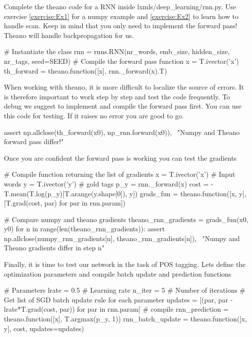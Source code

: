 \begin{exercise}
Complete the theano code for a RNN inside lxmls/deep\_learning/rnn.py. Use
exercise \ref{exercise:Ex1} for a numpy example and \ref{exercise:Ex2} to learn
how to handle scan. Keep in mind that you only need to implement the forward
pass! Theano will handle backpropagation for us. 
\begin{python}
# Instantiate the class
rnn = rnns.RNN(nr_words, emb_size, hidden_size, nr_tags, seed=SEED)
# Compile the forward pass function
x = T.ivector('x')
th_forward = theano.function([x], rnn._forward(x).T)
\end{python}
When working with theano, it is more difficult to localize the source of
errors. It is therefore important to work step by step and test the
code frequently. To debug we suggest to implement and compile the forward pass
first. You can use this code for testing. If it raises no error you are good to
go.
\begin{python}
assert np.allclose(th_forward(x0), np_rnn.forward(x0)), \
    "Numpy and Theano forward pass differ!"
\end{python}
Once you are confident the forward pass is working you can test the gradients
\begin{python}
# Compile function returning the list of gradients
x = T.ivector('x')     # Input words
y = T.ivector('y')     # gold tags 
p_y = rnn._forward(x)
cost = -T.mean(T.log(p_y)[T.arange(y.shape[0]), y])
grads_fun = theano.function([x, y], [T.grad(cost, par) for par in rnn.param])
\end{python}

\begin{python}
# Compare numpy and theano gradients
theano_rnn_gradients = grads_fun(x0, y0)
for n in range(len(theano_rnn_gradients)): 
    assert np.allclose(numpy_rnn_gradients[n], theano_rnn_gradients[n]), \
        "Numpy and Theano gradients differ in step n"
\end{python}

\noindent Finally, it is time to test our network in the task of POS tagging. Lets define
the optimization parameters and compile batch update and prediction
functions

\begin{python}
# Parameters
lrate = 0.5   # Learning rate
n_iter = 5    # Number of iterations
# Get list of SGD batch update rule for each parameter
updates = [(par, par - lrate*T.grad(cost, par)) for par in rnn.param]
# compile
rnn_prediction = theano.function([x], T.argmax(p_y, 1))
rnn_batch_update = theano.function([x, y], cost, updates=updates)
\end{python}


\end{exercise}

